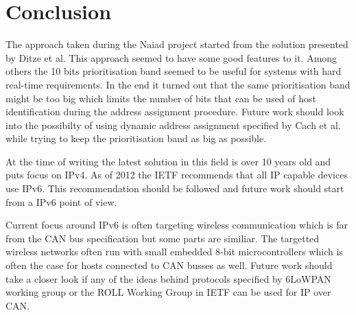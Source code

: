 \section{Conclusion}\label{sec:conclusion}
The approach taken during the Naiad project started from the solution presented
by Ditze et al. This approach seemed to have some good features to it. Among
others the 10 bits prioritisation band seemed to be useful for systems with
hard real-time requirements. In the end it turned out that the same
prioritisation band might be too big which limits the number of bits that can be
used of host identification during the address assignment procedure. Future
work should look into the possibilty of using dynamic address assignment
specified by Cach et al. while trying to keep the prioritisation band as big as
possible.

At the time of writing the latest solution in this field is over 10 years old
and puts focus on IPv4. As of 2012 the IETF recommends that all IP capable
devices use IPv6. This recommendation should be followed and future work should
start from a IPv6 point of view.

Current focus around IPv6 is often targeting wireless communication which is
far from the CAN bus specification but some parts are similiar. The targetted
wireless networks often run with small embedded 8-bit microcontrollers which is
often the case for hosts connected to CAN busses as well. Future work should
take a closer look if any of the ideas behind protocols specified by 6LoWPAN
working group or the ROLL Working Group in IETF can be used for IP over CAN.



